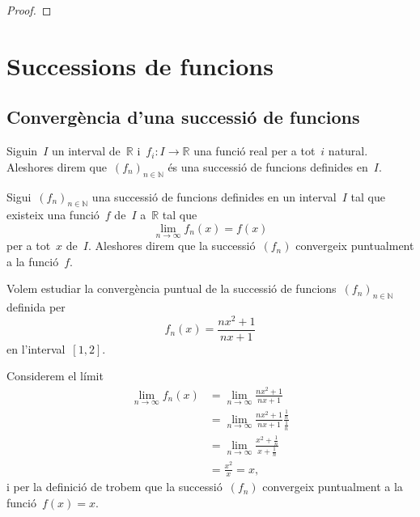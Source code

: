 \documentclass[../../main.tex]{subfiles}
\begin{document}
\begin{theorem}
\begin{proof}
\begin{comment}
			Aleshores amb \eqref{thm:Teorema de Cauchy:eq1} i \eqref{thm:Teorema de Cauchy:eq2} tenim que
			\[
			    \abs{\sum_{n=1}^{m}a_{\sigma(n)}b_{\tau(n)}-\sum_{n=0}^{\infty}a_{n}\sum_{n=0}^{\infty}b_{n}}+\abs{\sum_{n=0}^{N}a_{n}\sum_{n=0}^{N}b_{n}-\sum_{n=0}^{\infty}a_{n}\sum_{n=0}^{\infty}b_{n}}\leq\varepsilon,
			\]
			i per la desigualtat triangular %
			\[
			    \abs{\sum_{n=1}^{m}a_{\sigma(n)}b_{\tau(n)}-\sum_{n=0}^{N}a_{n}\sum_{n=0}^{N}b_{n}}+\abs{\sum_{n=0}^{N}a_{n}\sum_{n=0}^{N}b_{n}-\sum_{n=0}^{\infty}a_{n}\sum_{n=0}^{\infty}b_{n}}\leq\varepsilon,
			\]
		\end{comment}
		\end{proof}
	\end{theorem}
\section{Successions de funcions}
	\subsection{Convergència d'una successió de funcions}
	\begin{definition}
		\label{def:successió de funcions}
		Siguin~\(I\) un interval de~\(\mathbb{R}\) i~\(f_{i}\colon I\longrightarrow\mathbb{R}\) una funció real per a tot~\(i\) natural.
		Aleshores direm que~\((f_{n})_{n\in\mathbb{N}}\) és una successió de funcions definides en~\(I\).
	\end{definition}
	\begin{definition}
		\label{def:convergència puntual}
		Sigui~\((f_{n})_{n\in\mathbb{N}}\) una successió de funcions definides en un interval~\(I\) tal que existeix una funció~\(f\) de~\(I\) a~\(\mathbb{R}\) tal que
		\[
		    \lim_{n\to\infty}f_{n}(x)=f(x)
		\]
		per a tot~\(x\) de~\(I\).
		Aleshores direm que la successió~\((f_{n})\) convergeix puntualment a la funció~\(f\).
	\end{definition}
	\begin{example}
		\label{ex:convergència puntual d'una successió de funcions}
		Volem estudiar la convergència puntual de la successió de funcions~\((f_{n})_{n\in\mathbb{N}}\) definida per
		\[
		    f_{n}(x)=\frac{nx^{2}+1}{nx+1}
		\]
		en l'interval~\([1,2]\).
		\begin{solution}
			Considerem el límit
			\begin{align*}
				\lim_{n\to\infty}f_{n}(x)&=\lim_{n\to\infty}\frac{nx^{2}+1}{nx+1} \\
				&=\lim_{n\to\infty}\frac{nx^{2}+1}{nx+1}\frac{\frac{1}{n}}{\frac{1}{n}} \\
				&=\lim_{n\to\infty}\frac{x^{2}+\frac{1}{n}}{x+\frac{1}{n}} \\
				&=\frac{x^{2}}{x}=x,
			\end{align*}
			i per la definició de  trobem que la successió~\((f_{n})\) convergeix puntualment a la funció~\(f(x)=x\).
		\end{solution}
	\end{example}
\end{document}
